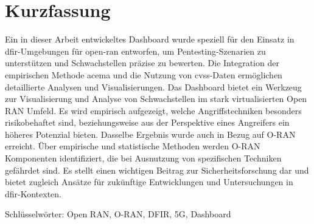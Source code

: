 \chapter*{Kurzfassung}
\label{chap:kurzfassung}
Ein in dieser Arbeit entwickeltes Dashboard wurde speziell für den Einsatz in \gls{dfir}-Umgebungen für \gls{open-ran} entworfen, um Pentesting-Szenarien zu unterstützen und Schwachstellen präzise zu bewerten. Die Integration der empirischen Methode \gls{acema} und die Nutzung von \gls{cvss}-Daten ermöglichen detaillierte Analysen und Visualisierungen. Das Dashboard bietet ein Werkzeug zur Visualisierung und Analyse von Schwachstellen im stark virtualisierten Open RAN Umfeld. Es wird empirisch aufgezeigt, welche Angriffstechniken besonders risikobehaftet sind, beziehungsweise aus der Perspektive eines Angreifers ein höheres Potenzial bieten. Dasselbe Ergebnis wurde auch in Bezug auf O-RAN erreicht. Über empirische und statistische Methoden werden O-RAN Komponenten identifiziert, die bei Ausnutzung von spezifischen Techniken gefährdet sind. Es stellt einen wichtigen Beitrag zur Sicherheitsforschung dar und bietet zugleich Ansätze für zukünftige Entwicklungen und Untersuchungen in \gls{dfir}-Kontexten.
\par Schlüsselwörter: Open RAN, O-RAN, DFIR, 5G, Dashboard

